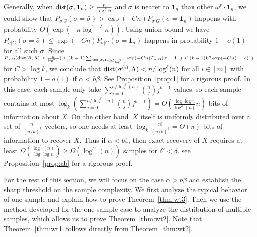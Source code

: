 \documentclass{article}
\begin{document}
Generally, when $\operatorname{dist}(\bar{\sigma}, \mathbf{1}_n) \geq \frac{n}{\log^{\delta} n}$ and $\bar{\sigma}$
is nearer to $\mathbf{1}_{n}$ than other $\omega^r \cdot \mathbf{1}_n$, we could show that
$P_{\sigma | G}(\sigma = \bar{\sigma} ) > \exp(-Cn) P_{\sigma | G}(\sigma = \mathbf{1}_n)$
happens with probability $O(\exp(-n \log^{1-\delta} n ))$. Using union bound we have
$P_{\sigma | G}(\sigma = \bar{\sigma} ) \leq \exp(-Cn) P_{\sigma | G}(\sigma = \mathbf{1}_n)$
happens in probability $1-o(1)$ for all such $\bar{\sigma}$.
Since $P_{\sigma | G}(\operatorname{dist}(\bar{\sigma}, \Lambda)\geq \frac{n}{\log^{\delta} n}) \leq
(k-1)\sum_{\operatorname{dist}(\bar{\sigma}, \mathbf{1}_n) \geq \frac{n}{\log^{\delta} n}}\exp(-Cn) P_{\sigma | G}(\sigma = \mathbf{1}_n)
\leq (k-1)k^n \exp(-Cn) = o(1)$ for $C> \log k$, we conclude that
$\operatorname{dist}(\sigma^{(i)}, \Lambda)< n/\log^{\delta}(n)$ for all $i\in[m]$ with probability $1-o(1)$ if $\alpha<b\beta$. See Proposition~\ref{prop:1} for a rigorous proof.
In this case, each sample only take $\sum_{j=0}^{n/\log^{\delta}(n)}\binom{n}{j}j^{k-1}$ values, so each sample contains at most $\log_k(\sum_{j=0}^{n/\log^{\delta}(n)}\binom{n}{j}j^{k-1})=O(\frac{\log\log n}{\log^{\delta}(n)} n)$ bits of information about $X$. On the other hand, $X$ itself is uniformly distributed over a set of $\frac{n!}{(n/k)^k}$ vectors, so one needs at least $\log_k\frac{n!}{(n/k)^k}=\Theta(n)$ bits of information to recover $X$. Thus if $\alpha<b\beta$, then exact recovery of $X$ requires at least $\Omega(\frac{\log^{\delta}(n)}{\log\log n})\ge \Omega(\log^{\delta'}(n))$ samples for $\delta'<\delta$. see Proposition~\ref{prop:ab} for a rigorous proof.


For the rest of this section, we will focus on the case $\alpha>b\beta$ and establish the sharp threshold on the sample complexity. We first analyze the typical behavior of one sample and explain how to prove Theorem~\ref{thm:wt3}. Then we use the method developed for the one sample case to analyze the distribution of multiple samples, which allows us to prove Theorem~\ref{thm:wt2}. Note that Theorem~\ref{thm:wt1} follows directly from Theorem~\ref{thm:wt2}.
\end{document}
